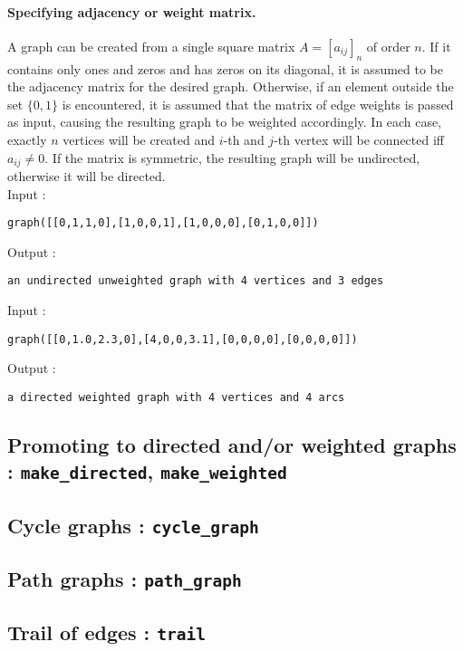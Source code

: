 \documentclass[a4paper,11pt]{article}
\begin{document}
\paragraph{Specifying adjacency or weight matrix.}
A graph can be created from a single square matrix $ A=[a_{ij}]_n $ of order $ n $. If it contains only ones and zeros and has zeros on its diagonal, it is assumed to be the adjacency matrix for the desired graph. Otherwise, if an element outside the set $ \{0,1\} $ is encountered, it is assumed that the matrix of edge weights is passed as input, causing the resulting graph to be weighted accordingly. In each case, exactly $ n $ vertices will be created and $ i $-th and $ j $-th vertex will be connected iff $ a_{ij}\neq 0 $. If the matrix is symmetric, the resulting graph will be undirected, otherwise it will be directed.\\
Input :
\begin{center}
  \tt graph([[0,1,1,0],[1,0,0,1],[1,0,0,0],[0,1,0,0]])
\end{center}
Output :
\begin{center}
  \tt an undirected unweighted graph with 4 vertices and 3 edges
\end{center}
Input :
\begin{center}
  \tt graph([[0,1.0,2.3,0],[4,0,0,3.1],[0,0,0,0],[0,0,0,0]])
\end{center}
Output :
\begin{center}
  \tt a directed weighted graph with 4 vertices and 4 arcs
\end{center}

\subsection{Promoting to directed and/or weighted graphs : {\tt make\_directed}, {\tt make\_weighted}}

\subsection{Cycle graphs : {\tt cycle\_graph}}

\subsection{Path graphs : {\tt path\_graph}}

\subsection{Trail of edges : {\tt trail}}
\end{document}
